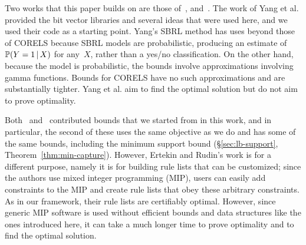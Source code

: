 \begin{arxiv}
Two works that this paper builds on are those of~\citet{YangRuSe16}, and~\citet{RudinEr15}.
%
The work of Yang et al. provided the bit vector libraries and several ideas that were used here,
and we used their code as a starting point.
%
Yang's SBRL method has uses beyond those of CORELS because SBRL models are probabilistic,
producing an estimate of~${\mathbb{P}(Y=1 \,|\, X)}$ for any~$X$, rather than a yes/no classification.
%
On the other hand, because the model is probabilistic, the bounds involve approximations
involving gamma functions.
%
Bounds for CORELS have no such approximations and are substantially tighter.
%
Yang et al. aim to find the optimal solution but do not aim to prove optimality.

Both~\citet{YangRuSe16} and~\citet{RudinEr15} contributed bounds that we started from
in this work, and in particular, the second of these uses the same objective as we do and has
some of the same bounds, including the minimum support bound (\S\ref{sec:lb-support}, Theorem~\ref{thm:min-capture}).
%
However, Ertekin and Rudin's work is for a different purpose,
namely it is for building rule lists that can be customized;
since the authors use mixed integer programming (MIP), users can easily
add constraints to the MIP and create rule lists that obey these arbitrary constraints.
%
As in our framework, their rule lists are certifiably optimal.
%
However, since generic MIP software is used without efficient bounds and
data structures like the ones introduced here,
it can take a much longer time to prove optimality and to find the optimal solution.
\end{arxiv}






